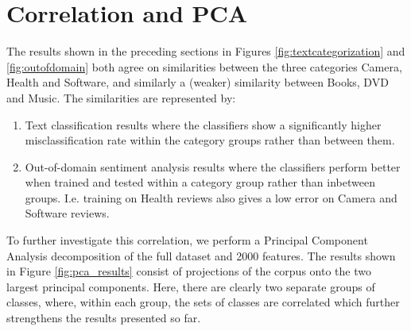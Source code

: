 \section{Correlation and PCA}
The results shown in the preceding sections in Figures \ref{fig:textcategorization} and \ref{fig:outofdomain} both agree on similarities between the three categories Camera, Health and Software, and similarly a (weaker) similarity between Books, DVD and Music. The similarities are represented by:
\begin{enumerate}
  \item Text classification results where the classifiers show a significantly higher misclassification rate within the category groups rather than between them.
  \item Out-of-domain sentiment analysis results where the classifiers perform better when trained and tested within a category group rather than inbetween groups. I.e. training on Health reviews also gives a low error on Camera and Software reviews.
\end{enumerate}
To further investigate this correlation, we perform a Principal Component Analysis decomposition of the full dataset and 2000 features. The results shown in Figure \ref{fig:pca_results} consist of projections of the corpus onto the two largest principal components. Here, there are clearly two separate groups of classes, where, within each group, the sets of classes are correlated which further strengthens the results presented so far.\\\\\\
